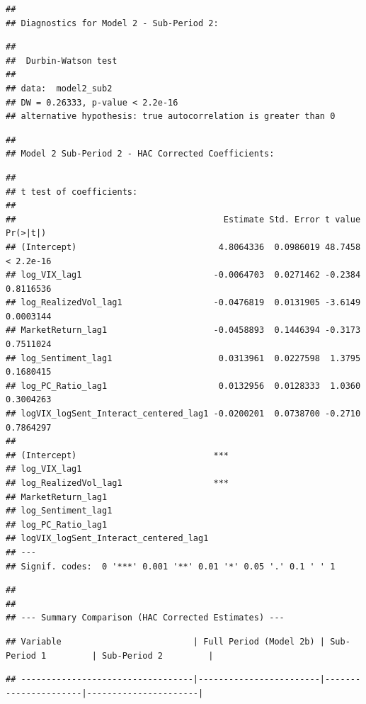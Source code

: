 \documentclass[
]{article}
\begin{document}
\begin{verbatim}
## 
## Diagnostics for Model 2 - Sub-Period 2:
\end{verbatim}

\begin{verbatim}
## 
##  Durbin-Watson test
## 
## data:  model2_sub2
## DW = 0.26333, p-value < 2.2e-16
## alternative hypothesis: true autocorrelation is greater than 0
\end{verbatim}

\begin{verbatim}
## 
## Model 2 Sub-Period 2 - HAC Corrected Coefficients:
\end{verbatim}

\begin{verbatim}
## 
## t test of coefficients:
## 
##                                         Estimate Std. Error t value  Pr(>|t|)
## (Intercept)                            4.8064336  0.0986019 48.7458 < 2.2e-16
## log_VIX_lag1                          -0.0064703  0.0271462 -0.2384 0.8116536
## log_RealizedVol_lag1                  -0.0476819  0.0131905 -3.6149 0.0003144
## MarketReturn_lag1                     -0.0458893  0.1446394 -0.3173 0.7511024
## log_Sentiment_lag1                     0.0313961  0.0227598  1.3795 0.1680415
## log_PC_Ratio_lag1                      0.0132956  0.0128333  1.0360 0.3004263
## logVIX_logSent_Interact_centered_lag1 -0.0200201  0.0738700 -0.2710 0.7864297
##                                          
## (Intercept)                           ***
## log_VIX_lag1                             
## log_RealizedVol_lag1                  ***
## MarketReturn_lag1                        
## log_Sentiment_lag1                       
## log_PC_Ratio_lag1                        
## logVIX_logSent_Interact_centered_lag1    
## ---
## Signif. codes:  0 '***' 0.001 '**' 0.01 '*' 0.05 '.' 0.1 ' ' 1
\end{verbatim}

\begin{verbatim}
## 
## 
## --- Summary Comparison (HAC Corrected Estimates) ---
\end{verbatim}

\begin{verbatim}
## Variable                          | Full Period (Model 2b) | Sub-Period 1         | Sub-Period 2         |
\end{verbatim}

\begin{verbatim}
## ----------------------------------|------------------------|----------------------|----------------------|
\end{verbatim}
\end{document}
